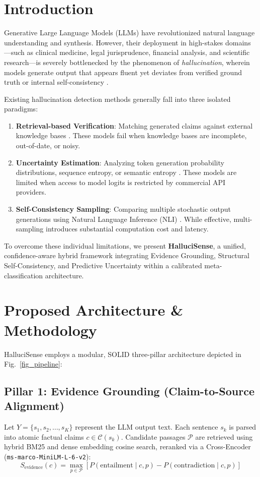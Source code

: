\documentclass[preprint,12pt,review]{elsarticle}
\begin{document}
\section{Introduction}
\label{sec:intro}
Generative Large Language Models (LLMs) have revolutionized natural language understanding and synthesis. However, their deployment in high-stakes domains—such as clinical medicine, legal jurisprudence, financial analysis, and scientific research—is severely bottlenecked by the phenomenon of \textit{hallucination}, wherein models generate output that appears fluent yet deviates from verified ground truth or internal self-consistency \cite{manakul2023selfcheckgpt, lin2022truthfulqa}.

Existing hallucination detection methods generally fall into three isolated paradigms:
\begin{enumerate}
    \item \textbf{Retrieval-based Verification}: Matching generated claims against external knowledge bases \cite{min2023factscore, thorne2018fever}. These models fail when knowledge bases are incomplete, out-of-date, or noisy.
    \item \textbf{Uncertainty Estimation}: Analyzing token generation probability distributions, sequence entropy, or semantic entropy \cite{kuhn2023semantic}. These models are limited when access to model logits is restricted by commercial API providers.
    \item \textbf{Self-Consistency Sampling}: Comparing multiple stochastic output generations using Natural Language Inference (NLI) \cite{manakul2023selfcheckgpt}. While effective, multi-sampling introduces substantial computation cost and latency.
\end{enumerate}

To overcome these individual limitations, we present \textbf{HalluciSense}, a unified, confidence-aware hybrid framework integrating Evidence Grounding, Structural Self-Consistency, and Predictive Uncertainty within a calibrated meta-classification architecture.

\section{Proposed Architecture \& Methodology}
\label{sec:architecture}

HalluciSense employs a modular, SOLID three-pillar architecture depicted in Fig.~\ref{fig_pipeline}:

\subsection{Pillar 1: Evidence Grounding (Claim-to-Source Alignment)}
Let $Y = \{s_1, s_2, \dots, s_K\}$ represent the LLM output text. Each sentence $s_k$ is parsed into atomic factual claims $c \in \mathcal{C}(s_k)$. Candidate passages $\mathcal{P}$ are retrieved using hybrid BM25 and dense embedding cosine search, reranked via a Cross-Encoder (\texttt{ms-marco-MiniLM-L-6-v2}):
\begin{equation}
S_{\text{evidence}}(c) = \max_{p \in \mathcal{P}} \left[ P(\text{entailment} \mid c, p) - P(\text{contradiction} \mid c, p) \right]
\end{equation}
\end{document}
